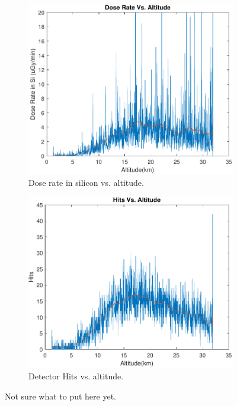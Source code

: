 \documentclass[final,1p, times, twocolumn]{elsarticle}
\begin{document}
\begin{figure}
\centering
\begin{subfigure}{.5\textwidth}
  \centering
  \includegraphics[scale=.5]{dva-cropped.pdf}
  \caption{Dose rate in silicon vs. altitude.}
  \label{fig:sub1}
\end{subfigure}%
\begin{subfigure}{.5\textwidth}
  \centering
  \includegraphics[scale=.5]{hva-cropped.pdf}
  \caption{Detector Hits vs. altitude.}
  \label{fig:sub2}
\end{subfigure}
\caption{Not sure what to put here yet.}
\label{fig:test}
\end{figure}
\end{document}
